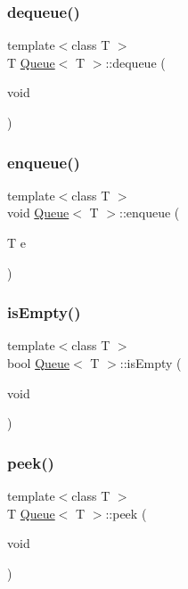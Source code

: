 \mbox{\label{class_queue_a0ea4eebce27fa776990577276d68ee62}} 
\subsubsection{\texorpdfstring{dequeue()}{dequeue()}}
{\footnotesize\ttfamily template$<$class T $>$ \\
T \hyperlink{class_queue}{Queue}$<$ T $>$\+::dequeue (\begin{DoxyParamCaption}\item[{void}]{ }\end{DoxyParamCaption})}

\mbox{\label{class_queue_a2b0d8e8d8cacf789bff0b4db73bf249b}} 
\subsubsection{\texorpdfstring{enqueue()}{enqueue()}}
{\footnotesize\ttfamily template$<$class T $>$ \\
void \hyperlink{class_queue}{Queue}$<$ T $>$\+::enqueue (\begin{DoxyParamCaption}\item[{T}]{e }\end{DoxyParamCaption})}

\mbox{\label{class_queue_af68a849aebf3a15e6a5559c8f2a0740d}} 
\subsubsection{\texorpdfstring{is\+Empty()}{isEmpty()}}
{\footnotesize\ttfamily template$<$class T $>$ \\
bool \hyperlink{class_queue}{Queue}$<$ T $>$\+::is\+Empty (\begin{DoxyParamCaption}\item[{void}]{ }\end{DoxyParamCaption})}

\mbox{\label{class_queue_a25c55852d37e76803d3890067df243cc}} 
\subsubsection{\texorpdfstring{peek()}{peek()}}
{\footnotesize\ttfamily template$<$class T $>$ \\
T \hyperlink{class_queue}{Queue}$<$ T $>$\+::peek (\begin{DoxyParamCaption}\item[{void}]{ }\end{DoxyParamCaption})}

